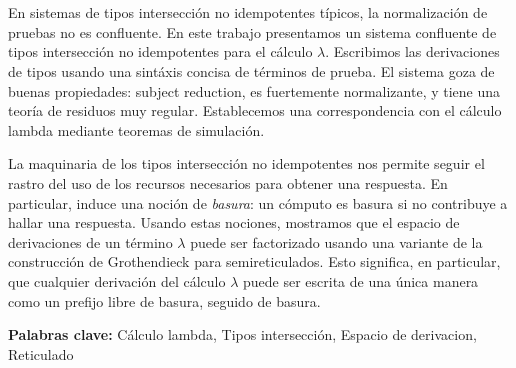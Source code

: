 \section*{}
En sistemas de tipos intersección no idempotentes típicos, la normalización de pruebas no es confluente.
En este trabajo presentamos un sistema confluente de tipos intersección no idempotentes para el cálculo $\lambda$.
Escribimos las derivaciones de tipos usando una sintáxis concisa de términos de prueba.
El sistema goza de buenas propiedades: subject reduction, es fuertemente normalizante, y tiene una teoría de
residuos muy regular.
Establecemos una correspondencia con el cálculo lambda mediante teoremas de simulación.

La maquinaria de los tipos intersección no idempotentes nos permite seguir el rastro del uso de los recursos
necesarios para obtener una respuesta.
En particular, induce una noción de \textit{basura}: un cómputo es basura si no contribuye a hallar una respuesta.
Usando estas nociones, mostramos que el espacio de derivaciones de un término $\lambda$ puede ser factorizado
usando una variante de la construcción de Grothendieck para semireticulados.
Esto significa, en particular, que cualquier derivación del cálculo $\lambda$ puede ser escrita
de una única manera como un prefijo libre de basura, seguido de basura.

\vspace{2cm}
\noindent
\textbf{Palabras clave:} Cálculo lambda, Tipos intersección, Espacio de derivacion, Reticulado
